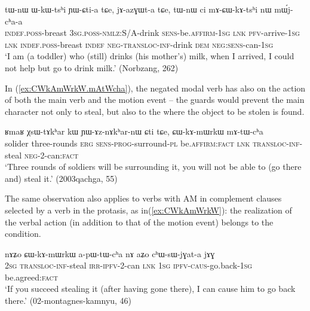 \documentclass[oneside,a4paper,11pt]{article}
\begin{document}
\begin{exe}
\ex \label{ex:mACWkAtshi}
\gll  tɯ-nɯ ɯ-kɯ-tsʰi ɲɯ-ɕti-a tɕe, jɤ-azɣɯt-a tɕe, tɯ-nɯ ci mɤ-ɕɯ-kɤ-tsʰi nɯ mɯ́j-cʰa-a \\
\textsc{indef}.\textsc{poss}-breast \textsc{3sg}.\textsc{poss}-\textsc{nmlz}:S/A-drink \textsc{sens}-be.\textsc{affirm}-\textsc{1sg} \textsc{lnk} \textsc{pfv}-arrive-\textsc{1sg} \textsc{lnk} \textsc{indef}.\textsc{poss}-breast  \textsc{indef} \textsc{neg}-\textsc{transloc}-\textsc{inf}-drink \textsc{dem} \textsc{neg}:\textsc{sens}-can-\textsc{1sg} \\
\glt `I am (a toddler) who (still) drinks (his mother's) milk, when I arrived, I could not help but go to drink milk.'  (Norbzang, 262)
 \end{exe}
 
 In (\ref{ex:CWkAmWrkW.mAtWcha}), the negated modal verb has also on the action of both the main verb and the motion event -- the guards would prevent the main character not only to steal, but also to the where the object to be stolen is found.
 
\begin{exe}
\ex \label{ex:CWkAmWrkW.mAtWcha}
\gll ʁmaʁ χsɯ-tɤkʰar kɯ ɲɯ-ɤz-nɤkʰar-nɯ ɕti tɕe, ɕɯ-kɤ-mɯrkɯ mɤ-tɯ-cʰa  \\
solider three-rounds \textsc{erg} \textsc{sens}-\textsc{prog}-surround-\textsc{pl} be.\textsc{affirm}:\textsc{fact} \textsc{lnk}  \textsc{transloc}-\textsc{inf}-steal \textsc{neg}-2-can:\textsc{fact} \\
\glt `Three rounds of soldiers will be surrounding it, you will not be able to (go there and) steal it.' (2003qachga, 55)
   \end{exe}
 
The same observation also applies to  verbs with AM in complement clauses selected by a verb in the protasis, as in(\ref{ex:CWkAmWrkW}): the realization of the verbal action (in addition to that of the motion event) belongs to the condition.

\begin{exe}
\ex \label{ex:CWkAmWrkW}
\gll nɤʑo ɕɯ-kɤ-mɯrkɯ a-pɯ-tɯ-cʰa nɤ aʑo cʰɯ-sɯ-jɣat-a jɤɣ \\
\textsc{2sg} \textsc{transloc}-\textsc{inf}-steal \textsc{irr}-\textsc{ipfv}-2-can \textsc{lnk} \textsc{1sg} \textsc{ipfv}-\textsc{caus}-go.back-\textsc{1sg} be.agreed:\textsc{fact} \\
\glt `If you succeed stealing it (after having gone there), I can cause him to go back there.' (02-montagnes-kamnyu, 46)
\end{exe}
\end{document}
